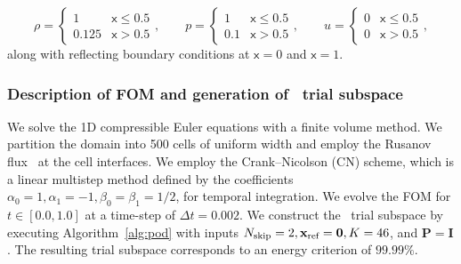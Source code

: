 \begin{equation*}
\rho = 
\begin{cases} 
      1 & \mathsf{x}\leq 0.5 \\
      0.125 & \mathsf{x} > 0.5 
   \end{cases},
\qquad
p = 
\begin{cases} 
      1 & \mathsf{x}\leq 0.5 \\
      0.1 & \mathsf{x} > 0.5 
   \end{cases},
\qquad
u = 
\begin{cases} 
      0 & \mathsf{x}\leq 0.5 \\
      0 & \mathsf{x} > 0.5 
   \end{cases},
\end{equation*}
along with reflecting boundary conditions at $\mathsf{x}=0$ and $\mathsf{x}=1$. 

\subsubsection{Description of FOM and generation of \spatialAcronym\ trial subspace}\label{sec:sod_fom}
We solve the 1D compressible Euler equations with a finite volume method. We partition the domain into 500 cells of uniform width and employ the Rusanov flux~\cite{rusanov} at the cell interfaces. We employ the Crank--Nicolson (CN) scheme, which is a linear multistep method defined by the coefficients $\alpha_0 = 1,\alpha_1 = -1, \beta_0 = \beta_1 = 1/2$, for temporal integration. We evolve the FOM for $t \in [0.0,1.0]$ at a time-step of $\Delta t = 0.002$. We construct the \spatialAcronym\ trial subspace by executing Algorithm~\ref{alg:pod} with inputs $N_{\text{skip}}=2, \mathbf{x}_\text{ref} = \boldsymbol 0, K=46 $, and $\mathbf{P} = \mathbf{I}$. The resulting trial subspace corresponds to an energy criterion of $99.99\%$.

